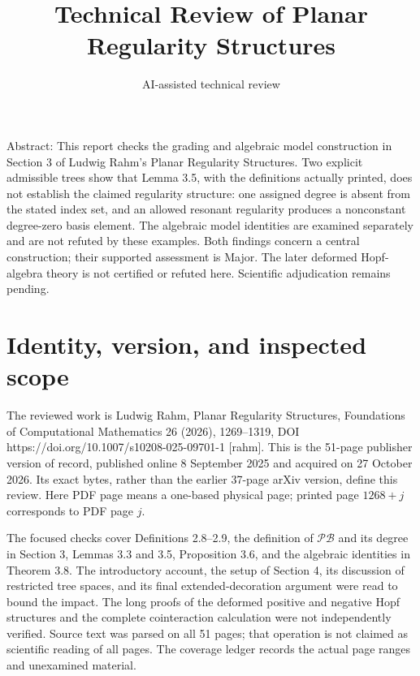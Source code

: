 \documentclass[10pt]{article}
\title{Technical Review of
Planar Regularity Structures}
\author{AI-assisted technical review}
\date{}
\begin{document}
\maketitle
Abstract: This report checks the grading and algebraic model construction in Section 3 of Ludwig Rahm’s Planar Regularity Structures. Two explicit admissible trees show that Lemma 3.5, with the definitions actually printed, does not establish the claimed regularity structure: one assigned degree is absent from the stated index set, and an allowed resonant regularity produces a nonconstant degree-zero basis element. The algebraic model identities are examined separately and are not refuted by these examples. Both findings concern a central construction; their supported assessment is Major. The later deformed Hopf-algebra theory is not certified or refuted here. Scientific adjudication remains pending.\par
\section*{Identity, version, and inspected scope}
The reviewed work is Ludwig Rahm, Planar Regularity Structures, Foundations of Computational Mathematics 26 (2026), 1269–1319, DOI https://doi.org/10.1007/s10208-025-09701-1 [rahm]. This is the 51-page publisher version of record, published online 8 September 2025 and acquired on 27 October 2026. Its exact bytes, rather than the earlier 37-page arXiv version, define this review. Here PDF page means a one-based physical page; printed page \(1268+j\) corresponds to PDF page \(j\).\par
The focused checks cover Definitions 2.8–2.9, the definition of \(\mathcal{PB}\) and its degree in Section 3, Lemmas 3.3 and 3.5, Proposition 3.6, and the algebraic identities in Theorem 3.8. The introductory account, the setup of Section 4, its discussion of restricted tree spaces, and its final extended-decoration argument were read to bound the impact. The long proofs of the deformed positive and negative Hopf structures and the complete cointeraction calculation were not independently verified. Source text was parsed on all 51 pages; that operation is not claimed as scientific reading of all pages. The coverage ledger records the actual page ranges and unexamined material.\par
\end{document}
